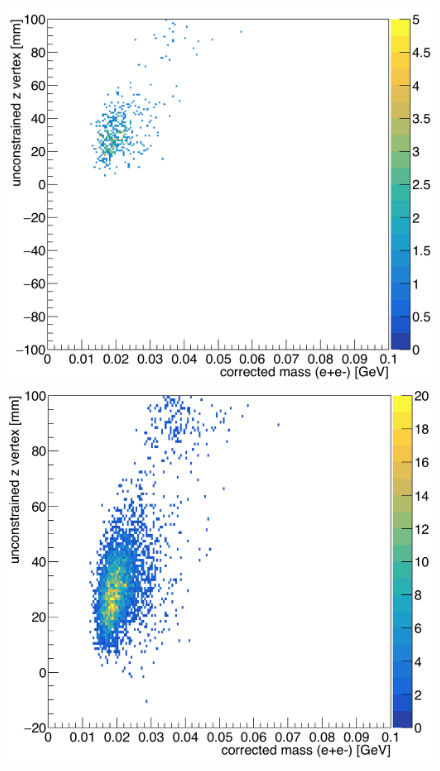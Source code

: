 \begin{figure}[hbt]
\begin{minipage}{0.5\textwidth}
 \includegraphics[width=\textwidth]{pics/appendix/zVm_L2L2_0p5_bl.png}
\end{minipage}\hfill\begin{minipage}{0.5\textwidth}
 \includegraphics[width=\textwidth]{pics/appendix/zVm_L2L2.png}
 \end{minipage}

\end{figure}
